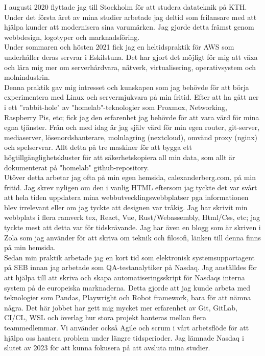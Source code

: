 \documentclass[../main.tex]{subfiles}
\begin{document}
\par
I augusti 2020 flyttade jag till Stockholm för att studera datateknik på KTH. Under det första året av mina studier arbetade jag deltid som frilansare med att hjälpa kunder att modernisera sina varumärken. Jag gjorde detta främst genom webbdesign, logotyper och marknadsföring.
\\

Under sommaren och hösten 2021 fick jag en heltidspraktik för AWS som underhåller deras servrar i Eskilstuna. Det har gjort det möjligt för mig att växa och lära mig mer om serverhårdvara, nätverk, virtualisering, operativsystem och molnindustrin.
\\

Denna praktik gav mig intresset och kunskapen som jag behövde för att börja experimentera med Linux och servermjukvara på min fritid. Efter att ha gått ner i ett ”rabbit-hole" av "homelab"-teknologier som Proxmox, Networking, Raspberry Pis, etc; fick jag den erfarenhet jag behövde för att vara värd för mina egna tjänster. Från och med idag är jag själv värd för min egen router, git-server, mediaserver, lösenordshanterare, molnlagring (nextcloud), omvänd proxy (nginx) och spelservrar. Allt detta på tre maskiner för att bygga ett högtillgänglighetskluster för att säkerhetskopiera all min data, som allt är dokumenterat på "homelab" github-repository.
\\

Utöver detta arbetar jag ofta på min egen hemsida, calexanderberg.com, på min fritid. Jag skrev nyligen om den i vanlig HTML eftersom jag tyckte det var svårt att hela tiden uppdatera mina webbutvecklingswebbplatser pga informationen blev irrelevant eller om jag tyckte att designen var tråkig. Jag har skrivit min webbplats i flera ramverk tex, React, Vue, Rust/Webassembly, Html/Css, etc; jag tyckte mest att detta var för tidskrävande. Jag har även en blogg som är skriven i Zola som jag använder för att skriva om teknik och filosofi, länken till denna finns på min hemsida.
\\

Sedan min praktik arbetade jag en kort tid som elektronisk systemsupportagent på SEB innan jag arbetade som QA-testanalytiker på Nasdaq. Jag anställdes för att hjälpa till att skriva och skapa automatiseringsskript för Nasdaqs interna system på de europeiska marknaderna. Detta gjorde att jag kunde arbeta med teknologier som Pandas, Playwright och Robot framework, bara för att nämna några. Det här jobbet har gett mig mycket mer erfarenhet av Git, GitLab, CI/CL, WSL och överlag hur stora projekt hanteras mellan flera teammedlemmar. Vi använder också Agile och scrum i vårt arbetsflöde för att hjälpa oss hantera problem under längre tidsperioder. Jag lämnade Nasdaq i slutet av 2023 för att kunna fokusera på att avsluta mina studier.
\\
\end{document}
